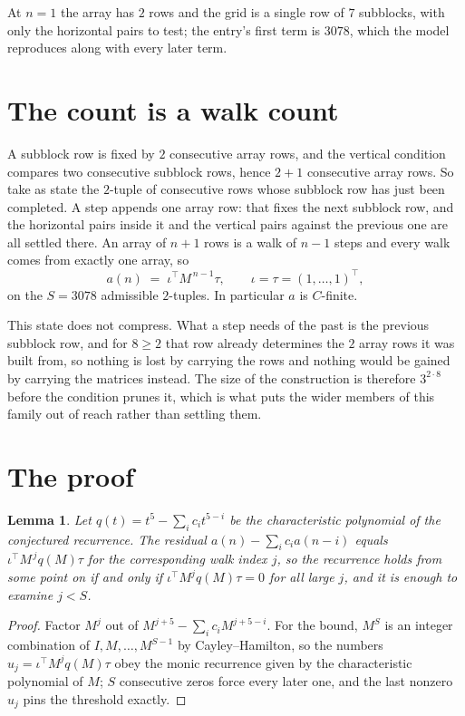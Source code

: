 \documentclass[11pt,a4paper]{article}
\theoremstyle{plain}
\newtheorem{lemma}[theorem]{Lemma}
\theoremstyle{definition}
\begin{document}
At $n=1$ the array has $2$ rows and the grid is a single row of $7$
subblocks, with only the horizontal pairs to test; the entry's first term is
$3078$, which the model reproduces along with every later term.

\section{The count is a walk count}

A subblock row is fixed by $2$ consecutive array rows, and the vertical condition compares
two consecutive subblock rows, hence $2+1$ consecutive array rows. So take as state the
$2$-tuple of consecutive rows whose subblock row has just been completed. A step appends one
array row: that fixes the next subblock row, and the horizontal pairs inside it and the
vertical pairs against the previous one are all settled there. An array of $n+1$ rows is
a walk of $n-1$ steps and every walk comes from exactly one array, so
\[
a(n)\;=\;\iota^{\!\top}M^{\,n-1}\tau,\qquad\iota=\tau=(1,\dots,1)^{\!\top},
\]
on the $S=3078$ admissible $2$-tuples. In particular $a$ is $C$-finite.

This state does not compress. What a step needs of the past is the previous subblock row, and
for $8\ge2$ that row already determines the $2$ array rows it was built from, so nothing
is lost by carrying the rows and nothing would be gained by carrying the matrices instead. The
size of the construction is therefore $3^{2\cdot8}$ before the condition prunes
it, which is what puts the wider members of this family out of reach rather than settling them.

\section{The proof}

\begin{lemma}\label{lem:crit}
Let $q(t)=t^{5}-\sum_i c_it^{5-i}$ be the characteristic polynomial of the
conjectured recurrence. The residual $a(n)-\sum_ic_ia(n-i)$ equals
$\iota^{\!\top}M^{\,j}q(M)\tau$ for the corresponding walk index $j$, so the recurrence
holds from some point on if and only if $\iota^{\!\top}M^{j}q(M)\tau=0$ for all large $j$,
and it is enough to examine $j<S$.
\end{lemma}

\begin{proof}
Factor $M^{j}$ out of $M^{j+5}-\sum_ic_iM^{j+5-i}$. For the bound, $M^{S}$
is an integer combination of $I,M,\dots,M^{S-1}$ by Cayley--Hamilton, so the numbers
$u_j=\iota^{\!\top}M^{j}q(M)\tau$ obey the monic recurrence given by the characteristic
polynomial of $M$; $S$ consecutive zeros force every later one, and the last nonzero $u_j$
pins the threshold exactly.
\end{proof}
\end{document}
